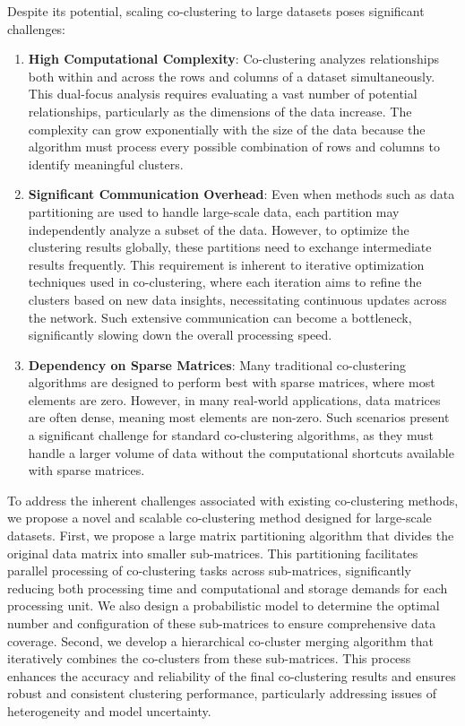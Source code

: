 Despite its potential, scaling co-clustering to large datasets poses significant challenges:
\begin{enumerate}
    \item \textbf{High Computational Complexity}: Co-clustering analyzes relationships both within and across the rows and columns of a dataset simultaneously. This dual-focus analysis requires evaluating a vast number of potential relationships, particularly as the dimensions of the data increase. The complexity can grow exponentially with the size of the data because the algorithm must process every possible combination of rows and columns to identify meaningful clusters.  
    \item \textbf{Significant Communication Overhead}: Even when methods such as data partitioning are used to handle large-scale data, each partition may independently analyze a subset of the data. However, to optimize the clustering results globally, these partitions need to exchange intermediate results frequently. This requirement is inherent to iterative optimization techniques used in co-clustering, where each iteration aims to refine the clusters based on new data insights, necessitating continuous updates across the network. Such extensive communication can become a bottleneck, significantly slowing down the overall processing speed.
   \item \textbf{Dependency on Sparse Matrices}: Many traditional co-clustering algorithms are designed to perform best with sparse matrices, where most elements are zero. However, in many real-world applications, data matrices are often dense, meaning most elements are non-zero. Such scenarios present a significant challenge for standard co-clustering algorithms, as they must handle a larger volume of data without the computational shortcuts available with sparse matrices.
\end{enumerate}

To address the inherent challenges associated with existing co-clustering methods, we propose a novel and scalable co-clustering method designed for large-scale datasets. First,  we propose a large matrix partitioning algorithm that divides the original data matrix into smaller sub-matrices. This partitioning facilitates parallel processing of co-clustering tasks across sub-matrices, significantly reducing both processing time and computational and storage demands for each processing unit. We also design a probabilistic model to determine the optimal number and configuration of these sub-matrices to ensure comprehensive data coverage.
Second, we develop a hierarchical co-cluster merging algorithm that iteratively combines the co-clusters from these sub-matrices. This process enhances the accuracy and reliability of the final co-clustering results and ensures robust and consistent clustering performance, particularly addressing issues of heterogeneity and model uncertainty.

